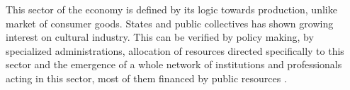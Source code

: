\documentclass[a4paper, 12pt, openright, oneside, german, french, brazil, english]{abntex2}
\begin{document}
	
	This sector of the economy is defined by its logic towards production, unlike market of consumer goods. States and public collectives has shown growing interest on cultural industry. This can be verified by policy making, by specialized administrations, allocation of resources directed specifically to this sector and the emergence of a whole network of institutions and professionals acting in this sector, most of them financed by public resources \cite{tolila2007cultura}.



	
\end{document}
